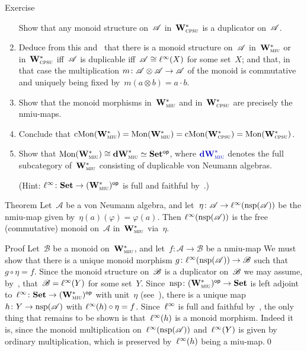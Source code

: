 \documentclass[a]{subfiles}
\begin{document}
\begin{parsec}
\begin{point}{Exercise}
\begin{enumerate}
Show that any monoid structure on~$\mathscr{A}$
in~$\mathbf{W}^*_{\text{\textsc{cpsu}}}$
is a duplicator on~$\mathscr{A}$.
\item
Deduce
from this and~
that there is a monoid structure
on~$\mathscr{A}$ in~$\mathbf{W}^*_{\text{\textsc{miu}}}$ or in~$\mathbf{W}^*_{\text{\textsc{cpsu}}}$
iff~$\mathscr{A}$ is duplicable
iff~$\mathscr{A}\cong \ell^\infty(X)$ for some set~$X$;
and that,
in that case
the multiplication $m\colon \mathscr{A}\otimes\mathscr{A}\to\mathscr{A}$
of the monoid
is commutative
and uniquely being fixed by~$m(a\otimes b)=a\cdot b$.
\item
Show that the monoid morphisms
in~$\mathbf{W}^*_{\text{\textsc{miu}}}$ and in~$\mathbf{W}^*_{\text{\textsc{cpsu}}}$
are precisely
the nmiu-maps.
\item
Conclude that
$\mathrm{cMon}(\mathbf{W}^*_{\text{\textsc{miu}}})
=\mathrm{Mon}(\mathbf{W}^*_{\text{\textsc{miu}}})
=\mathrm{cMon}(\mathbf{W}^*_{\text{\textsc{cpsu}}})
=\mathrm{Mon}(\mathbf{W}^*_{\text{\textsc{cpsu}}})$.
\item
Show  that $\mathrm{Mon}(\mathbf{W}^*_{\text{\textsc{miu}}})\cong\mathbf{dW}^*_{\text{\textsc{miu}}}\simeq{\mathbf{Set}}{^{\mathsf{op}}}$,
where $\Define{\dW{miu}}$ denotes the full subcategory
of~$\mathbf{W}^*_{\text{\textsc{miu}}}$
consisting of duplicable von Neumann algebras.

(Hint: $\ell^\infty\colon \mathbf{Set}\to {(\mathbf{W}^*_{\text{\textsc{miu}}})}{^{\mathsf{op}}}$ is full and faithful
by~.)
\end{enumerate}
\end{point}
\begin{point}{Theorem}%
\label{thm:free-monoid-in-vNAMIU}
Let~$\mathscr{A}$
be a von Neumann algebra,
and let~$\eta\colon \mathscr{A}\to\ell^\infty(\mathrm{nsp}(\mathscr{A}))$
be the nmiu-map
given by~$\eta(a)(\varphi)= \varphi(a)$.
Then $\ell^\infty(\mathrm{nsp}(\mathscr{A}))$
is the free (commutative) monoid
on~$\mathscr{A}$
in~$\mathbf{W}^*_{\text{\textsc{miu}}}$ via~$\eta$.
\begin{point}{Proof}%
Let~$\mathscr{B}$
be a monoid 
on~$\mathbf{W}^*_{\text{\textsc{miu}}}$,
and let~$f\colon \mathscr{A}\to\mathscr{B}$
be a nmiu-map
We must show that
there is a unique
monoid morphism
$g\colon \ell^\infty(\mathrm{nsp}(\mathscr{A}))
\rightarrow \mathscr{B}$
such that~$g\circ \eta = f$.
Since the monoid structure on~$\mathscr{B}$
is a duplicator on~$\mathscr{B}$
we may assume,
by~,
that~$\mathscr{B}=\ell^\infty(Y)$
for some set~$Y$.
Since~$\mathrm{nsp}\colon {(\mathbf{W}^*_{\text{\textsc{miu}}})}{^{\mathsf{op}}}\to \mathbf{Set}$
is left adjoint
to~$\ell^\infty\colon \mathbf{Set} \to {(\mathbf{W}^*_{\text{\textsc{miu}}})}{^{\mathsf{op}}}$
with unit~$\eta$ (see~),
there is a unique map $h\colon Y\to \mathrm{nsp}(\mathscr{A})$
with $\ell^\infty(h)\circ \eta = f$.
Since~$\ell^\infty$ is full and faithful
by~,
the only thing that remains to be shown is that~$\ell^\infty(h)$
is a monoid morphism.
Indeed it is,
since the monoid multiplication
on~$\ell^\infty(\mathrm{nsp}(\mathscr{A}))$
and~$\ell^\infty(Y)$
is given by ordinary multiplication,
which is preserved by~$\ell^\infty(h)$ being a miu-map.\qed
\end{point}
\end{point}


\end{parsec}
\end{document}
